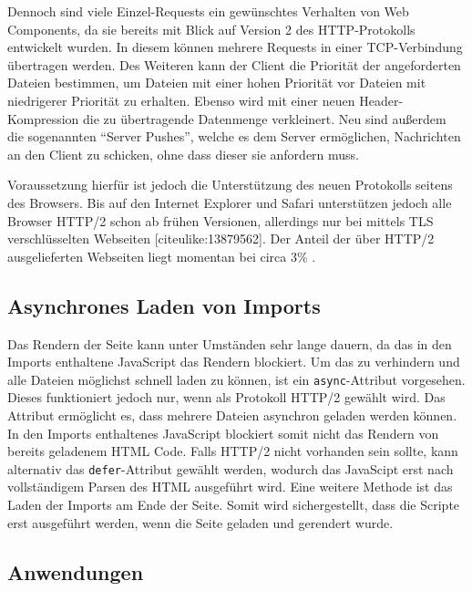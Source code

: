 Dennoch sind viele Einzel-Requests ein gewünschtes Verhalten von Web Components, da sie bereits mit Blick auf Version 2 des \ac{HTTP}-Protokolls entwickelt wurden. In diesem können mehrere Requests in einer \ac{TCP}-Verbindung übertragen werden. Des Weiteren kann der Client die Priorität der angeforderten Dateien bestimmen, um Dateien mit einer hohen Priorität vor Dateien mit niedrigerer Priorität zu erhalten. Ebenso wird mit einer neuen Header-Kompression die zu übertragende Datenmenge verkleinert. Neu sind außerdem die sogenannten ``Server Pushes'', welche es dem Server ermöglichen, Nachrichten an den Client zu schicken, ohne dass dieser sie anfordern muss.

Voraussetzung hierfür ist jedoch die Unterstützung des neuen Protokolls seitens des Browsers. Bis auf den Internet Explorer und Safari unterstützen jedoch alle Browser \ac{HTTP}/2 schon ab frühen Versionen, allerdings nur bei mittels \ac{TLS} verschlüsselten Webseiten [citeulike:13879562]. Der Anteil der über \ac{HTTP}/2 ausgelieferten Webseiten liegt momentan bei circa 3\% \cite{citeulike:13879575}.


\subsection{Asynchrones Laden von Imports}\label{asynchrones-laden-von-imports}

Das Rendern der Seite kann unter Umständen sehr lange dauern, da das in den Imports enthaltene JavaScript das Rendern blockiert. Um das zu verhindern und alle Dateien möglichst schnell laden zu können, ist ein \texttt{async}-Attribut vorgesehen. Dieses funktioniert jedoch nur, wenn als Protokoll \ac{HTTP}/2 gewählt wird. Das Attribut ermöglicht es, dass mehrere Dateien asynchron geladen werden können. In den Imports enthaltenes JavaScript blockiert somit nicht das Rendern von bereits geladenem \ac{HTML} Code. Falls \ac{HTTP}/2 nicht vorhanden sein sollte, kann alternativ das \texttt{defer}-Attribut gewählt werden, wodurch das JavaScipt erst nach vollständigem Parsen des \ac{HTML} ausgeführt wird. Eine weitere Methode ist das Laden der Imports am Ende der Seite. Somit wird sichergestellt, dass die Scripte erst ausgeführt werden, wenn die Seite geladen und gerendert wurde.


\subsection{Anwendungen}\label{anwendungen}

